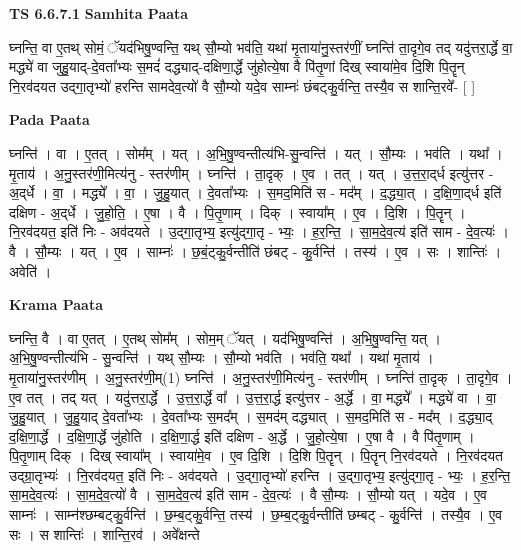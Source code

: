 \documentclass[17pt]{extarticle}
\begin{document}
\textbf{TS 6.6.7.1 } \newline
\textbf{Samhita Paata} \newline

घ्नन्ति॒ वा ए॒तथ् सोमं॒ ॅयद॑भिषु॒ण्वन्ति॒ यथ् सौ॒म्यो भव॑ति॒ यथा॑ मृ॒ताया॑नु॒स्तर॑णीं॒ घ्नन्ति॑ ता॒दृगे॒व तद् यदु॑त्तरा॒र्द्धे वा॒ मद्ध्ये॑ वा जुहु॒याद्-दे॒वता᳚भ्यः स॒मदं॑ दद्ध्याद्-दक्षिणा॒र्द्धे जु॑होत्ये॒षा वै पि॑तृ॒णां दिख् स्वाया॑मे॒व दि॒शि पि॒तॄन् नि॒रव॑दयत उद्गा॒तृभ्यो॑ हरन्ति सामदेव॒त्यो॑ वै सौ॒म्यो यदे॒व साम्नः॑ छंबट्कु॒र्वन्ति॒ तस्यै॒व स शान्ति॒रवे᳚- [  ] \newline

\textbf{Pada Paata} \newline

घ्नन्ति॑ । वा । ए॒तत् । सोम᳚म् । यत् । अ॒भि॒षु॒ण्वन्तीत्य॑भि-सु॒न्वन्ति॑ । यत् । सौ॒म्यः । भव॑ति । यथा᳚ । मृ॒ताय॑ । अ॒नु॒स्तर॑णी॒मित्य॑नु - स्तर॑णीम् । घ्नन्ति॑ । ता॒दृक् । ए॒व । तत् । यत् । उ॒त्त॒रा॒द्‌र्ध इत्यु॑त्तर - अ॒द्‌र्धे । वा॒ । मद्ध्ये᳚ । वा॒ । जु॒हु॒यात् । दे॒वता᳚भ्यः । स॒मद॒मिति॑ स - मद᳚म् । द॒द्ध्या॒त् । द॒क्षि॒णा॒द्‌र्ध इति॑ दक्षिण - अ॒द्‌र्धे । जु॒हो॒ति॒ । ए॒षा । वै । पि॒तृ॒णाम् । दिक् । स्वाया᳚म् । ए॒व । दि॒शि । पि॒तॄन् । नि॒रव॑दयत॒ इति॑ निः - अव॑दयते । उ॒द्गा॒तृभ्य॒ इत्यु॑द्गा॒तृ - भ्यः॒ । ह॒र॒न्ति॒ । सा॒म॒दे॒व॒त्य॑ इति॑ साम - दे॒व॒त्यः॑ । वै । सौ॒म्यः । यत् । ए॒व । साम्नः॑ । छ॒बं॒ट्कु॒र्वन्तीति॑ छंबट् - कु॒र्वन्ति॑ । तस्य॑ । ए॒व । सः । शान्तिः॑ । अवेति॑ ।  \newline


\textbf{Krama Paata} \newline

घ्नन्ति॒ वै । वा ए॒तत् । ए॒तथ् सोम᳚म् । सोम॒म् ॅयत् । यद॑भिषु॒ण्वन्ति॑ । अ॒भि॒षु॒ण्वन्ति॒ यत् । अ॒भि॒षु॒ण्वन्तीत्य॑भि - सु॒न्वन्ति॑ । यथ् सौ॒म्यः । सौ॒म्यो भव॑ति । भव॑ति॒ यथा᳚ । यथा॑ मृ॒ताय॑ । मृ॒ताया॑नु॒स्तर॑णीम् । अ॒नु॒स्तर॑णी॒म्(1) घ्नन्ति॑ । अ॒नु॒स्तर॑णी॒मित्य॑नु - स्तर॑णीम् । घ्नन्ति॑ ता॒दृक् । ता॒दृगे॒व । ए॒व तत् । तद् यत् । यदु॑त्तरा॒र्द्धे । उ॒त्त॒रा॒र्द्धे वा᳚ । उ॒त्त॒रा॒र्द्ध इत्यु॑त्तर - अ॒र्द्धे । वा॒ मद्ध्ये᳚ । मद्ध्ये॑ वा । वा॒ जु॒हु॒यात् । जु॒हु॒याद् दे॒वता᳚भ्यः । दे॒वता᳚भ्यः स॒मद᳚म् । स॒मद॑म् दद्ध्यात् । स॒मद॒मिति॑ स - मद᳚म् । द॒द्ध्या॒द् द॒क्षि॒णा॒र्द्धे । द॒क्षि॒णा॒र्द्धे जु॑होति । द॒क्षि॒णा॒र्द्ध इति॑ दक्षिण - अ॒र्द्धे । जु॒हो॒त्ये॒षा । ए॒षा वै । वै पि॑तृ॒णाम् । पि॒तृ॒णाम् दिक् । दिख् स्वाया᳚म् । स्वाया॑मे॒व । ए॒व दि॒शि । दि॒शि पि॒तॄन् । पि॒तॄन् नि॒रव॑दयते । नि॒रव॑दयत उद्ग्रा॒तृभ्यः॑ । नि॒रव॑दयत॒ इति॑ निः - अव॑दयते । उ॒द्‍गा॒तृभ्यो॑ हरन्ति । उ॒द्‍गा॒तृभ्य॒ इत्यु॑द्‍गा॒तृ - भ्यः॒ । ह॒र॒न्ति॒ सा॒म॒दे॒व॒त्यः॑ । सा॒म॒दे॒व॒त्यो॑ वै । सा॒म॒दे॒व॒त्य॑ इति॑ साम - दे॒व॒त्यः॑ । वै सौ॒म्यः । सौ॒म्यो यत् । यदे॒व । ए॒व साम्नः॑ । साम्न॑श्छम्बट्कु॒र्वन्ति॑ । छ॒म्ब॒ट्कु॒र्वन्ति॒ तस्य॑ । छ॒म्ब॒ट्कु॒र्वन्तीति॑ छम्बट् - कु॒र्वन्ति॑ । तस्यै॒व । ए॒व सः । स शान्तिः॑ । शान्ति॒रव॑ । अवे᳚क्षन्ते \newline
\end{document}
